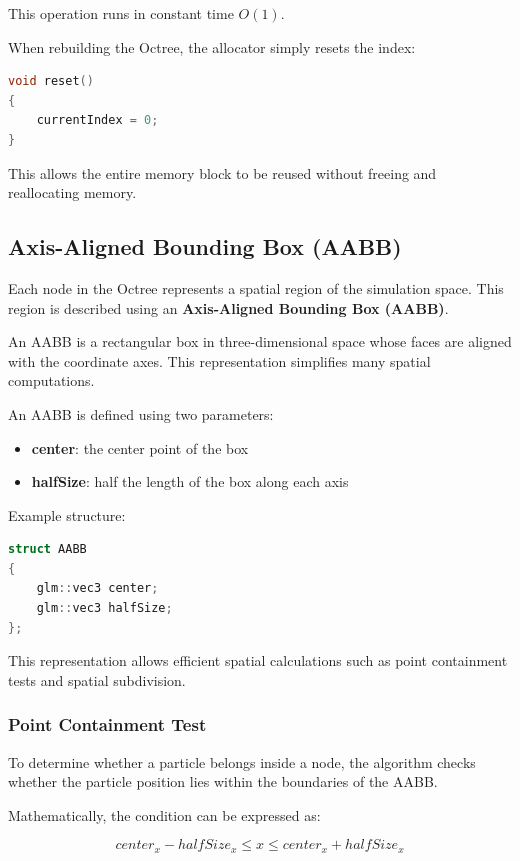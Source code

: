This operation runs in constant time $O(1)$.

When rebuilding the Octree, the allocator simply resets the index:

\begin{lstlisting}[language=C++]
void reset()
{
    currentIndex = 0;
}
\end{lstlisting}

This allows the entire memory block to be reused without freeing and reallocating memory.

\subsection{Axis-Aligned Bounding Box (AABB)}

Each node in the Octree represents a spatial region of the simulation space. This region is described using an \textbf{Axis-Aligned Bounding Box (AABB)}.

An AABB is a rectangular box in three-dimensional space whose faces are aligned with the coordinate axes. This representation simplifies many spatial computations.

An AABB is defined using two parameters:

\begin{itemize}
\item \textbf{center}: the center point of the box
\item \textbf{halfSize}: half the length of the box along each axis
\end{itemize}

Example structure:

\begin{lstlisting}[language=C++]
struct AABB
{
    glm::vec3 center;
    glm::vec3 halfSize;
};
\end{lstlisting}

This representation allows efficient spatial calculations such as point containment tests and spatial subdivision.

\subsubsection{Point Containment Test}

To determine whether a particle belongs inside a node, the algorithm checks whether the particle position lies within the boundaries of the AABB.

Mathematically, the condition can be expressed as:

\[
center_x - halfSize_x \le x \le center_x + halfSize_x
\]

